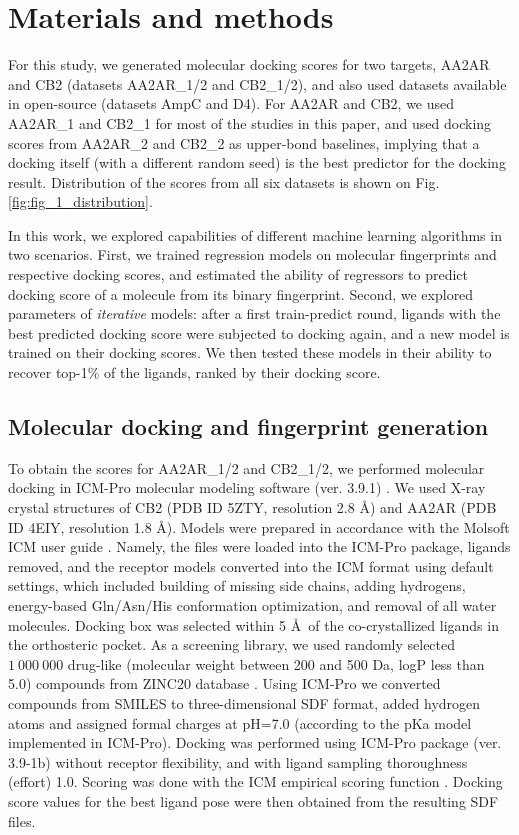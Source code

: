 \section{Materials and methods}
For this study, we generated molecular docking scores for two targets, AA2AR and CB2 (datasets AA2AR\_1/2 and CB2\_1/2), and also used datasets available in open-source \cite{ultralarge_docking_first} (datasets AmpC and D4). For AA2AR and CB2, we used AA2AR\_1 and CB2\_1 for most of the studies in this paper, and used docking scores from AA2AR\_2 and CB2\_2 as upper-bond baselines, implying that a docking itself (with a different random seed) is the best predictor for the docking result. Distribution of the scores from all six datasets is shown on Fig. \ref{fig:fig_1_distribution}.

In this work, we explored capabilities of different machine learning algorithms in two scenarios. First, we trained regression models on molecular fingerprints and respective docking scores, and estimated the ability of regressors to predict docking score of a molecule from its binary fingerprint. Second, we explored parameters of \textit{iterative} models: after a first train-predict round, ligands with the best predicted docking score were subjected to docking again, and a new model is trained on their docking scores. We then tested these models in their ability to recover top-1\% of the ligands, ranked by their docking score.


\subsection{Molecular docking and fingerprint generation}
To obtain the scores for AA2AR\_1/2 and CB2\_1/2, we performed molecular docking in ICM-Pro molecular modeling software (ver. 3.9.1) \cite{molsoft_guide}. We used X-ray crystal structures of CB2 (PDB ID 5ZTY, resolution 2.8 \AA) and AA2AR (PDB ID 4EIY, resolution 1.8 \AA). Models were prepared in accordance with the Molsoft ICM user guide \cite{molsoft_guide}. Namely, the files were loaded into the ICM-Pro package, ligands removed, and the receptor models converted into the ICM format using default settings, which included building of missing side chains, adding hydrogens, energy-based Gln/Asn/His conformation optimization, and removal of all water molecules. Docking box was selected within 5 \AA \ of the co-crystallized ligands in the orthosteric pocket. As a screening library, we used randomly selected $1\ 000\ 000$ drug-like (molecular weight between 200 and 500 Da, logP less than 5.0) compounds from ZINC20 database \cite{Irwin2020ZINC20Discovery}. Using ICM-Pro we converted compounds from SMILES to three-dimensional SDF  format, added hydrogen atoms and assigned formal charges at pH=7.0 (according to the pKa model implemented in ICM-Pro). Docking was performed using ICM-Pro package (ver. 3.9-1b) without receptor flexibility, and with ligand sampling thoroughness (effort) 1.0. Scoring was done with the ICM empirical scoring function \cite{abagyan_biased_1994}. Docking score values for the best ligand pose were then obtained from the resulting SDF files.


